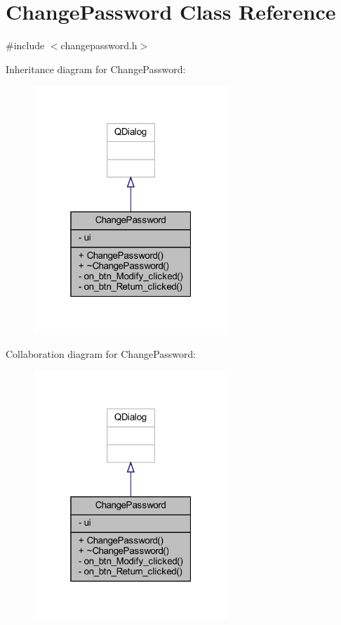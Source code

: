 \hypertarget{class_change_password}{}\section{Change\+Password Class Reference}
\label{class_change_password}


{\ttfamily \#include $<$changepassword.\+h$>$}



Inheritance diagram for Change\+Password\+:
\nopagebreak
\begin{figure}[H]
\begin{center}
\leavevmode
\includegraphics[width=208pt]{class_change_password__inherit__graph}
\end{center}
\end{figure}


Collaboration diagram for Change\+Password\+:
\nopagebreak
\begin{figure}[H]
\begin{center}
\leavevmode
\includegraphics[width=208pt]{class_change_password__coll__graph}
\end{center}
\end{figure}
